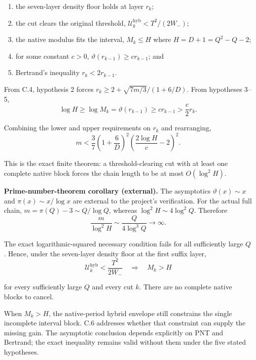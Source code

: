 \begin{enumerate}
\item the seven-layer density floor holds at layer $r_k$;
\item the cut clears the original threshold, $\mathcal U_k^{\mathrm{hyb}}\lt T^2/(2W_-)$;
\item the native modulus fits the interval, $M_k\le H$ where $H=D+1=Q^2-Q-2$;
\item for some constant $c>0$, $\vartheta(r_{k-1})\ge cr_{k-1}$; and
\item Bertrand's inequality $r_k\lt2r_{k-1}$.
\end{enumerate}

From C.4, hypothesis 2 forces
$r_k\ge2+\sqrt{7m/3}/(1+6/D)$. From hypotheses 3--5,
\begin{equation*}
\log H\ge\log M_k=\vartheta(r_{k-1})\ge cr_{k-1}>\frac c2 r_k.
\end{equation*}

Combining the lower and upper requirements on $r_k$ and rearranging,
\begin{equation*}
m\lt\frac37\left(1+\frac6D\right)^2\left(\frac{2\log H}{c}-2\right)^2.
\end{equation*}

This is the exact finite theorem: a threshold-clearing cut with at least one
complete native block forces the chain length to be at most $O(\log^2H)$.

\textbf{Prime-number-theorem corollary (external).} The asymptotics
$\vartheta(x)\sim x$ and $\pi(x)\sim x/\log x$ are external to the project's
verification. For the actual full chain, $m=\pi(Q)-3\sim Q/\log Q$, whereas
$\log^2H\sim4\log^2Q$. Therefore
\begin{equation*}
\frac{m}{\log^2H}\sim\frac{Q}{4\log^3Q}\longrightarrow\infty.
\end{equation*}

The exact logarithmic-squared necessary condition fails for all sufficiently
large $Q$. Hence, under the seven-layer density floor at the first suffix
layer,
\begin{equation*}
\mathcal U_k^{\mathrm{hyb}}\lt\frac{T^2}{2W_-}
\quad\Longrightarrow\quad
M_k>H
\end{equation*}

for every sufficiently large $Q$ and every cut $k$. There are no complete
native blocks to cancel.

When $M_k>H$, the native-period hybrid envelope still
constrains the single incomplete interval block. C.6 addresses whether that
constraint can supply the missing gain. The asymptotic conclusion depends
explicitly on PNT and Bertrand; the exact inequality remains valid without
them under the five stated hypotheses.

